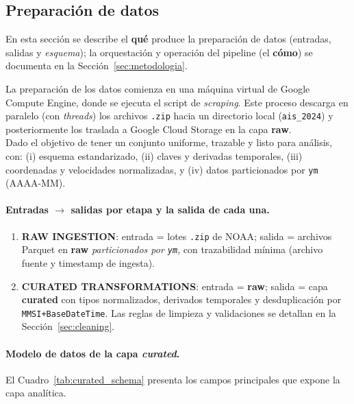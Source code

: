 \documentclass[10pt]{article}
\begin{document}
\subsection{Preparación de datos}
En esta sección se describe el \textbf{qué} produce la preparación de datos (entradas, salidas y \emph{esquema}); la orquestación y operación del pipeline (el \textbf{cómo}) se documenta en la Sección~\ref{sec:metodologia}.

La preparación de los datos comienza en una máquina virtual de Google Compute Engine, donde se ejecuta el script de \textit{scraping}. Este proceso descarga en paralelo (con \textit{threads}) los archivos \texttt{.zip} hacia un directorio local (\texttt{ais\_2024}) y posteriormente los traslada a Google Cloud Storage en la capa \textbf{raw}.\\

Dado el objetivo de tener un conjunto uniforme, trazable y listo para análisis, con: (i) esquema estandarizado, (ii) claves y derivadas temporales, (iii) coordenadas y velocidades normalizadas, y (iv) datos particionados por \texttt{ym} (AAAA-MM).

\paragraph{Entradas $\rightarrow$ salidas por etapa y la salida de cada una.}
\begin{enumerate}
  \item \textbf{RAW INGESTION}: entrada = lotes \texttt{.zip} de NOAA; salida = archivos Parquet en \textbf{raw} \emph{particionados por \texttt{ym}}, con trazabilidad mínima (archivo fuente y timestamp de ingesta).
  \item \textbf{CURATED TRANSFORMATIONS}: entrada = \textbf{raw}; salida = capa \textbf{curated} con tipos normalizados, derivados temporales y desduplicación por \texttt{MMSI+BaseDateTime}. Las reglas de limpieza y validaciones se detallan en la Sección~\ref{sec:cleaning}.
\end{enumerate}

\paragraph{Modelo de datos de la capa \textit{curated}.}
El Cuadro~\ref{tab:curated_schema} presenta los campos principales que expone la capa analítica.
\end{document}
